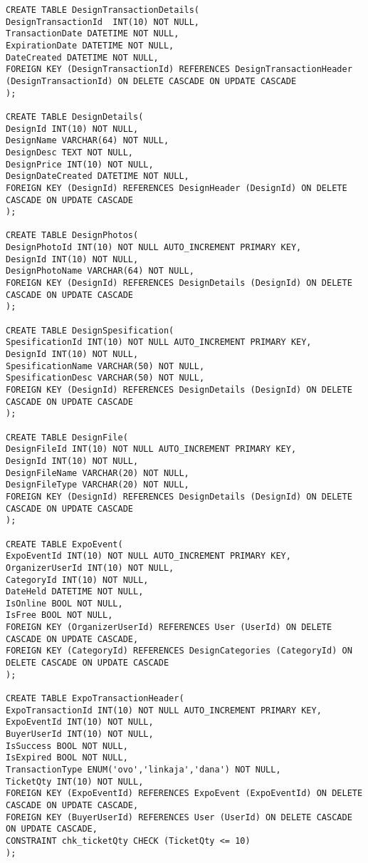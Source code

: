 \begin{lstlisting}
CREATE TABLE DesignTransactionDetails(
DesignTransactionId  INT(10) NOT NULL,
TransactionDate DATETIME NOT NULL,
ExpirationDate DATETIME NOT NULL,
DateCreated DATETIME NOT NULL,
FOREIGN KEY (DesignTransactionId) REFERENCES DesignTransactionHeader (DesignTransactionId) ON DELETE CASCADE ON UPDATE CASCADE
);

CREATE TABLE DesignDetails(
DesignId INT(10) NOT NULL,
DesignName VARCHAR(64) NOT NULL,
DesignDesc TEXT NOT NULL,
DesignPrice INT(10) NOT NULL,
DesignDateCreated DATETIME NOT NULL,
FOREIGN KEY (DesignId) REFERENCES DesignHeader (DesignId) ON DELETE CASCADE ON UPDATE CASCADE
);

CREATE TABLE DesignPhotos(
DesignPhotoId INT(10) NOT NULL AUTO_INCREMENT PRIMARY KEY,
DesignId INT(10) NOT NULL,
DesignPhotoName VARCHAR(64) NOT NULL,
FOREIGN KEY (DesignId) REFERENCES DesignDetails (DesignId) ON DELETE CASCADE ON UPDATE CASCADE
);

CREATE TABLE DesignSpesification(
SpesificationId INT(10) NOT NULL AUTO_INCREMENT PRIMARY KEY,
DesignId INT(10) NOT NULL,
SpesificationName VARCHAR(50) NOT NULL,
SpesificationDesc VARCHAR(50) NOT NULL,
FOREIGN KEY (DesignId) REFERENCES DesignDetails (DesignId) ON DELETE CASCADE ON UPDATE CASCADE
);

CREATE TABLE DesignFile(
DesignFileId INT(10) NOT NULL AUTO_INCREMENT PRIMARY KEY,
DesignId INT(10) NOT NULL,
DesignFileName VARCHAR(20) NOT NULL,
DesignFileType VARCHAR(20) NOT NULL,
FOREIGN KEY (DesignId) REFERENCES DesignDetails (DesignId) ON DELETE CASCADE ON UPDATE CASCADE
);

CREATE TABLE ExpoEvent(
ExpoEventId INT(10) NOT NULL AUTO_INCREMENT PRIMARY KEY,
OrganizerUserId INT(10) NOT NULL,
CategoryId INT(10) NOT NULL,
DateHeld DATETIME NOT NULL,
IsOnline BOOL NOT NULL,
IsFree BOOL NOT NULL,
FOREIGN KEY (OrganizerUserId) REFERENCES User (UserId) ON DELETE CASCADE ON UPDATE CASCADE,
FOREIGN KEY (CategoryId) REFERENCES DesignCategories (CategoryId) ON DELETE CASCADE ON UPDATE CASCADE
);

CREATE TABLE ExpoTransactionHeader(
ExpoTransactionId INT(10) NOT NULL AUTO_INCREMENT PRIMARY KEY,
ExpoEventId INT(10) NOT NULL,   
BuyerUserId INT(10) NOT NULL,
IsSuccess BOOL NOT NULL,
IsExpired BOOL NOT NULL,
TransactionType ENUM('ovo','linkaja','dana') NOT NULL,
TicketQty INT(10) NOT NULL,
FOREIGN KEY (ExpoEventId) REFERENCES ExpoEvent (ExpoEventId) ON DELETE CASCADE ON UPDATE CASCADE,
FOREIGN KEY (BuyerUserId) REFERENCES User (UserId) ON DELETE CASCADE ON UPDATE CASCADE,
CONSTRAINT chk_ticketQty CHECK (TicketQty <= 10)
);


\end{lstlisting}
